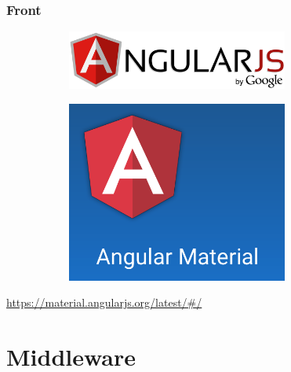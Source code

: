 \documentclass[10pt, compress]{beamer}
\begin{document}
\begin{frame}[fragile]

  \frametitle{Front}

  \begin{figure}
    \centering
    \begin{subfigure}{.5\textwidth}
      \centering
      \includegraphics[width=0.8\textwidth]{images/angularjs}
    \end{subfigure}%
    \begin{subfigure}{.5\textwidth}
      \centering
      \includegraphics[width=0.8\textwidth]{images/angular_material}
    \end{subfigure}
  \end{figure}
  \begin{center}
    \url{https://material.angularjs.org/latest/#/}
  \end{center}

\end{frame}

\section{Middleware}
\end{document}
